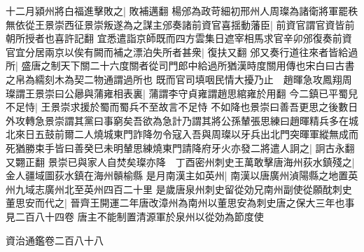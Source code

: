 十二月潁州將白福進擊敗之|{
	敗補邁翻}
楊邠為政苛細初邢州人周璨為諸衛將軍罷秩無依從王景崇西征景崇叛遂為之謀主邠奏諸前資官喜揺動藩臣|{
	前資官謂官資皆前朝所授者也喜許記翻}
宜悉遣詣京師既而四方雲集日遮宰相馬求官辛卯邠復奏前資官宜分居兩京以俟有闕而補之漂泊失所者甚衆|{
	復扶又翻}
邠又奏行道往來者皆給過所|{
	盛唐之制天下關二十六度關者從司門郎中給過所猶漢時度關用傳也宋白曰古書之帛為繻刻木為契二物通謂過所也}
既而官司填咽民情大擾乃止　趙暉急攻鳳翔周璨謂王景崇曰公曏與蒲雍相表裏|{
	蒲謂李守貞雍謂趙思綰雍於用翻}
今二鎮已平蜀兒不足恃|{
	王景崇求援於蜀而蜀兵不至故言不足恃}
不如降也景崇曰善吾更思之後數日外攻轉急景崇謂其黨曰事窮矣吾欲為急計乃謂其將公孫輦張思練曰趙暉精兵多在城北來日五鼓前爾二人燒城東門詐降勿令寇入吾與周璨以牙兵出北門突暉軍縱無成而死猶勝束手皆曰善癸巳未明輦思練燒東門請降府牙火亦發二將遣人詗之|{
	詗古永翻又翾正翻}
景崇已與家人自焚矣璨亦降　丁酉密州刺史王萬敢擊唐海州荻水鎮殘之|{
	金人疆域圖荻水鎮在海州贑榆縣}
是月南漢主如英州|{
	南漢以唐廣州湞陽縣之地置英州九域志廣州北至英州四百二十里}
是歲唐泉州刺史留從効兄南州副使從願酖刺史董思安而代之|{
	晉齊王開運二年唐改漳州為南州以董思安為刺史唐之保大三年也事見二百八十四卷}
唐主不能制置清源軍於泉州以從効為節度使

資治通鑑卷二百八十八
